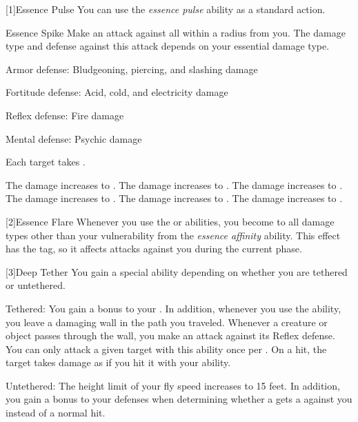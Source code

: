     [1]{Essence Pulse} You can use the \textit{essence pulse} ability as a standard action.
    \begin{magicalactiveability}{Essence Spike}
        \rankline
        Make an attack against all  within a \smallarea radius from you.
        The damage type and defense against this attack depends on your essential damage type.
        \begin{raggeditemize}
            \item Armor defense: Bludgeoning, piercing, and slashing damage
            \item Fortitude defense: Acid, cold, and electricity damage
            \item Reflex defense: Fire damage
            \item Mental defense: Psychic damage
        \end{raggeditemize}
        \hit Each target takes \damagerankone{}.

        \rankline
         The damage increases to \damageranktwo{}.
         The damage increases to \damagerankthree{}.
         The damage increases to \damagerankfour{}.
         The damage increases to \damagerankfive{}.
         The damage increases to \damageranksix{}.
         The damage increases to \damagerankseven{}.
    \end{magicalactiveability}

    [2]{Essence Flare} Whenever you use the  or  abilities, you  become \impervious to all damage types other than your vulnerability from the \textit{essence affinity} ability.
    This effect has the  tag, so it affects attacks against you during the current phase.

    [3]{Deep Tether} You gain a special ability depending on whether you are tethered or untethered.
    \begin{raggeditemize}
        \item Tethered: You gain a  bonus to your .
            In addition, whenever you use the  ability, you leave a damaging wall in the path you traveled.
            Whenever a creature or object passes through the wall, you make an attack against its Reflex defense.
            You can only attack a given target with this ability once per .
            On a hit, the target takes damage as if you hit it with your  ability.
        \item Untethered: The height limit of your fly speed increases to 15 feet.
            In addition, you gain a  bonus to your defenses when determining whether a  gets a  against you instead of a normal hit.
    \end{raggeditemize}

